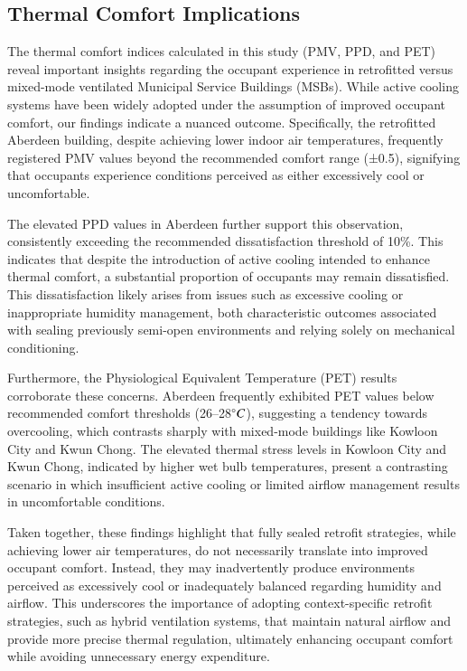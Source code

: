 \documentclass[preprint,12pt]{elsarticle}
\begin{document}
\subsection{Thermal Comfort Implications}
The thermal comfort indices calculated in this study (PMV, PPD, and PET) reveal important insights regarding the occupant experience in retrofitted versus mixed-mode ventilated Municipal Service Buildings (MSBs). While active cooling systems have been widely adopted under the assumption of improved occupant comfort, our findings indicate a nuanced outcome. Specifically, the retrofitted Aberdeen building, despite achieving lower indoor air temperatures, frequently registered PMV values beyond the recommended comfort range (±0.5), signifying that occupants experience conditions perceived as either excessively cool or uncomfortable.

The elevated PPD values in Aberdeen further support this observation, consistently exceeding the recommended dissatisfaction threshold of 10\%. This indicates that despite the introduction of active cooling intended to enhance thermal comfort, a substantial proportion of occupants may remain dissatisfied. This dissatisfaction likely arises from issues such as excessive cooling or inappropriate humidity management, both characteristic outcomes associated with sealing previously semi-open environments and relying solely on mechanical conditioning.

Furthermore, the Physiological Equivalent Temperature (PET) results corroborate these concerns. Aberdeen frequently exhibited PET values below recommended comfort thresholds (26–28$\degree C$), suggesting a tendency towards overcooling, which contrasts sharply with mixed-mode buildings like Kowloon City and Kwun Chong. The elevated thermal stress levels in Kowloon City and Kwun Chong, indicated by higher wet bulb temperatures, present a contrasting scenario in which insufficient active cooling or limited airflow management results in uncomfortable conditions.

Taken together, these findings highlight that fully sealed retrofit strategies, while achieving lower air temperatures, do not necessarily translate into improved occupant comfort. Instead, they may inadvertently produce environments perceived as excessively cool or inadequately balanced regarding humidity and airflow. This underscores the importance of adopting context-specific retrofit strategies, such as hybrid ventilation systems, that maintain natural airflow and provide more precise thermal regulation, ultimately enhancing occupant comfort while avoiding unnecessary energy expenditure.
\end{document}

